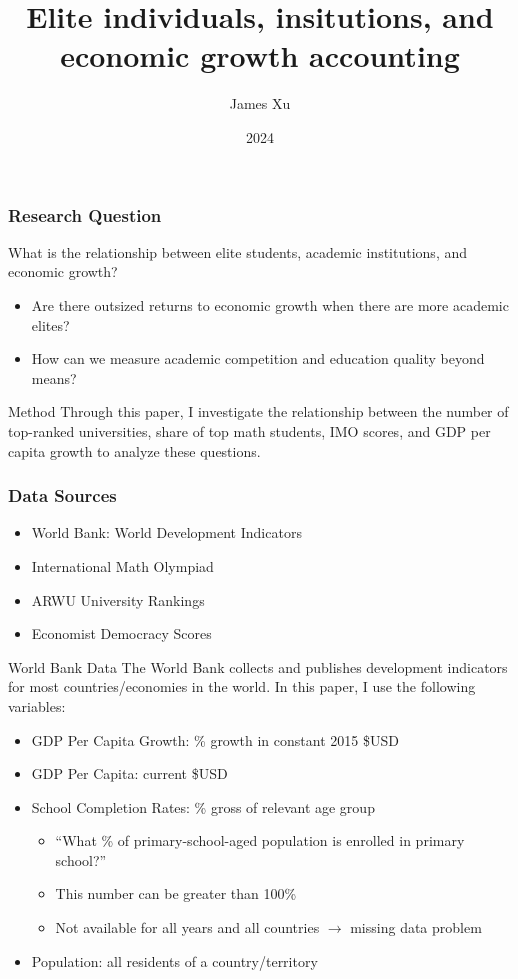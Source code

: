 \documentclass[10pt]{beamer}
\title{Elite individuals, insitutions, and economic growth accounting}
\author{James Xu}
\institute{ECON 442, Duke University}
\date{2024}
\begin{document}

\frame{\titlepage}

\begin{frame}
    \frametitle{Research Question}
    \begin{block}{What is the relationship between elite students, academic institutions, and economic growth?}
        \begin{itemize}
            \item Are there outsized returns to economic growth when there are more academic elites?
            \item How can we measure academic competition and education quality beyond means?
        \end{itemize}
    \end{block}
    \begin{exampleblock}{Method}
        Through this paper, I investigate the relationship between the number of top-ranked universities, share of top math students,
        IMO scores, and GDP per capita growth to analyze these questions.
    \end{exampleblock}
\end{frame}

\begin{frame}
\frametitle{Data Sources}
\begin{itemize}
    \item World Bank: World Development Indicators
    \item International Math Olympiad
    \item ARWU University Rankings
    \item Economist Democracy Scores
\end{itemize}
\end{frame}

\begin{frame}{World Bank Data}
    The World Bank collects and publishes development indicators for most countries/economies in the world. In this paper, I use the following variables:

    \begin{itemize}
        \item GDP Per Capita Growth: \% growth in constant 2015 \$USD
        \item GDP Per Capita: current \$USD
        \item School Completion Rates: \% gross of relevant age group
        \begin{itemize}
            \item ``What \% of primary-school-aged population is enrolled in primary school?''
            \item This number can be greater than 100\%
            \item Not available for all years and all countries $\rightarrow$ missing data problem
        \end{itemize}
        \item Population: all residents of a country/territory
    \end{itemize}
\end{frame}
\end{document}
